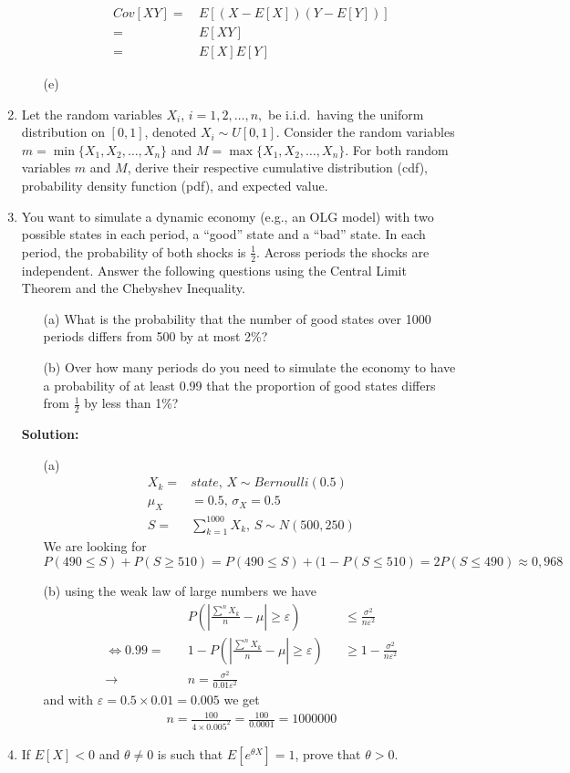 \documentclass[letterpaper,12pt]{article}
\theoremstyle{definition}
\begin{document}
\begin{enumerate}
\begin{itemize}
\begin{align*}
			Cov[XY]=& \, E\left[ (X-E[X])(Y-E[Y]) \right] \\
			=& \, E[XY]  \\
			=& \, E[X]E[Y]
			\end{align*}
			\item[(e)] 
\end{itemize}
	\item Let the random variables $X_i$, $i=1,2,\ldots,n,$ be i.i.d.\ having the uniform distribution on $[0,1]$, denoted $X_i \sim U[0,1]$. Consider the random variables $m=\min\{X_1,X_2,\ldots,X_n\}$ and $M=\max\{X_1,X_2,\ldots,X_n\}$. For both random variables $m$ and $M$, derive their respective cumulative distribution (cdf), probability density function (pdf), and expected value.

	\item You want to simulate a dynamic economy (e.g., an OLG model) with two possible states in each period, a ``good'' state and a ``bad'' state. In each period, the probability of both shocks is $\frac{1}{2}$. Across periods the shocks are independent. Answer the following questions using the Central Limit Theorem and the Chebyshev Inequality.
		\begin{itemize}
			\item[(a)] What is the probability that the number of good states over 1000 periods differs from 500 by at most 2\%?
			\item[(b)] Over how many periods do you need to simulate the economy to have a probability of at least 0.99 that the proportion of good states differs from $\frac{1}{2}$ by less than 1\%?
		\end{itemize}
\textbf{Solution:}
\begin{itemize}
\item[(a)] \begin{align*} 
X_k=&state, \, X \sim Bernoulli(0.5)\\
\mu_X&=0.5, \, \sigma_X=0.5\\
S =& \sum^{1000}_{k=1} X_k, \,
S \sim N(500, 250)
\end{align*}
We are looking for $P(490 \leq S)+P(S \geq 510)= P(490 \leq S) +(1-P(S \leq 510) = 2P(S \leq 490) \approx 0,968
$ 


\item[(b)] using the weak law of large numbers we have \begin{align*}
&P\left(|\frac{\sum^n X_k}{n} -\mu| \geq \varepsilon \right)  &&\leq \frac{\sigma^2}{n \varepsilon^2} \\
\Leftrightarrow 0.99 = \quad &1-P\left(|\frac{\sum^n X_k}{n} -\mu| \geq \varepsilon \right) &&\geq 1 - \frac{\sigma^2}{n \varepsilon^2} \\
\rightarrow \quad &n=\frac{\sigma^2}{0.01\varepsilon^2}
\end{align*}
and with $\varepsilon= 0.5 \times 0.01= 0.005$ we get
\begin{align*}
n = \frac{100}{4 \times 0.005^2} = \frac{100}{0.0001} = 1000000
\end{align*}
\end{itemize}
	\item If $E[X]<0$ and $\theta \neq 0$ is such that $E[e^{\theta X}]=1$, prove that $\theta > 0$.
	

\end{enumerate}
\end{document}
